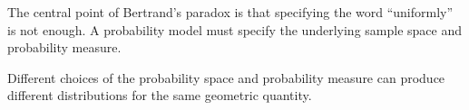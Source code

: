 
\begin{important}

The central point of Bertrand's paradox is that specifying the word
``uniformly'' is not enough. A probability model must specify the
underlying sample space and probability measure.

Different choices of the probability space and probability measure can
produce different distributions for the same geometric quantity.

\end{important}



\lectureend
